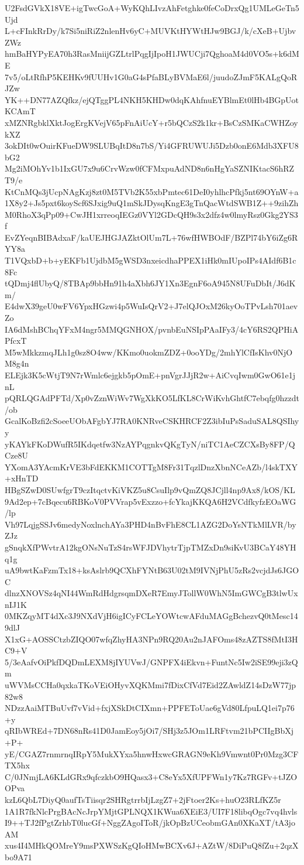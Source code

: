 U2FsdGVkX18VE+igTwcGoA+WyKQhLIvzAhFetghke0feCoDrxQg1UMLeGeTn5Ujd
L+cFInkRrDy/k7Si5niRiZ2nlenHv6yC+MUVKtHYWtHJw9BGJ/k/cXeB+UjbvZWz
hmBaHYPyEA70h3RasMniijGZLtrlPqgIjIpoH1JWUCji7QghoaM4d0VO5s+k6dME
7v5/oLtRfhP5KEHKv9fUUHv1G0aG4sPfaBLyBVMaE6l/juudoZJmF5KALgQoRJZw
YK++DN77AZQfkz/ejQTggPL4NKH5KHDw0dqKAhfnuEYBlmEt0lHb4BGpUotKCAmT
xMZNRgbklXktJogErgKVejV65pFnAiUcY+r5bQCzS2k1kr+BsCzSMKaCWHZoykXZ
3okDIt0wOuirKFueDW9SLUBqItD8n7bS/Yi4GFRUWUJi5Dzb0onE6Mdb3XFU8bG2
Mg2iMOhYv1b1IxGU7x9u6CrvWzw0fCFMxpuAdND8n6nHgYaSZNIKtacS6hRZT9/e
KtCnMQs3jUcpNAgKzj8zt0M5TVb2K55xbPmtec61DeI0yhlhcPfkj5nt69OYnW+a
1X8y2+Js5pxt6koyScf6SJxig9uQ1mSkJDysqKngE3gTnQacWtdSWB1Z++9zihZh
M0RhoX3qPp09+CwJH1xrreoqIEGz0VYl2GDcQH9s3x2dfz4w0lmyRsz0Gkg2YS3f
EvZYeqnBIBAdxaF/kaUEJHGJAZktOlUm7L+76wfHWBOdF/BZPl74bY6iZg6RYY8a
T1VQxbD+b+yEKFb1UjdbM5gWSD3nxeicdhaPPEX1iHk0mIUpoIPs4AIdf6B1c8Fc
tQDmj4flUbyQ/8TBAp9bbHn91h4aXbh6JY1Xn3EgnF6oA945N8UFuDbIt/J6dKm/
E4dwX39geU0wFV6YpxHGzwi4p5WuIsQrV2+J7elQJOxM26kyOoTPvLsh701aevZo
IA6dMshBChqYFxM4ngr5MMQGNHOX/pvnbEuNSIpPAaIFy3/4cY6RS2QPHiAPfcxT
M5wMkkzmqJLh1g0sz8O4ww/KKmo0uokmZDZ+0ooYDg/2mhYlCfIsKhv0NjOM8g4n
ELEjk3K5cWtjT9N7rWmlc6ejgkb5pOmE+pnVgrJJjR2w+AiCvqIwm0GwO61e1jnL
pQRLQGAdPFTd/Xp0vZznWiWv7WgXkKO5LfKL8CrWiKvhGhtfC7ebqfg0hzzdt/ob
GcalKoBzfi2cSoeeUObAFgbYJ7RA0KNRveCSKHRCF2Z3ibIuPsSaduSAL8QSIhyy
yKAYkFKoDWufR5IKdqetfw3NzAYPqgnkvQKgTyN/niTC1AeCZCXsBy8FP/QCze8U
YXomA3YAcmKrVE3bFdEKKM1COTTgM8Fr31TqzlDnzXbnNCeAZb/l4skTXY+xHnTD
HBgSZwD0SUwfgrT9czItqctvKiVKZ5u8CsuIlp9vQmZQ8JCjll4np9Ax8/kOS/KL
9Ad2ep+7cBqecu6RBKoV0PVVrap5vExzzo+fcYkajKKQA6H2VCdfkyfzEOaWG/lp
Vh97LqjgSSJv6medyNoxlnchAYa3PHD4nBvFhE8CL1AZG2DoYsNTkMlLVR/byZJz
gSnqkXfPWvtrA12kgONsNuTzS4rsWFJDVhytrTjpTMZxDn9siKvU3BCaY48YHq1g
uA9bwtKaFzmTx18+ksAslrb9QCXhFYNtB63U02tM9IVNjPhU5zRs2vcjdJs6JGOC
dlnzXNOVSz4qNI44WmRdHdgrsqmDXeR7EmyJTollW0WhN5ImGWCgB3tlwUxnIJ1K
0MKZqyMT4dXc3J9NXdVjH6igICyFCLeYOWtcwAFduMAGgBchezvQ0tMesc149dlJ
X1xG+AOSSCtzbZIQO07wfqZhyHA3NPn9RQ20Au2nJAFOms48zAZTS8fMtI3HC9+V
5/3eAafvOiPkfDQDmLEXM8jIYUVwJ/GNPFX4iEkvn+FuntNc5Iw2iSE99eji3zQm
uWVMsCCHa0qxkaTKoVEiOHyvXQKMmi7fDixCfVd7Eid2ZAwldZ14sDzW77jp82w8
NDzzAaiMTBuUvf7vVid+fxjXSkDtCIXmn+PPFEToUae6gVd80LfpuLQ1ei7p76+y
qRIbWREd+7DN68nRs41D0JamEoy5jOi7/SHj3z5JOm1LRFtvm21bPCIIgBbXj+P+
yE/CGAZ7rnmrnqIRpY5MukXYxa5hnwHxwcGRAGN9eKh9Vmwnt0Pr0Mzg3CFTX5hx
C/0JNmjLA6KLdGRx9qfczkbO9HQasx3+C8eYx5XfUPFWn1y7Kz7RGFv+tJZOOPva
kzL6QbL7DiyQ0aufTsTiisqr2SHRgtrrbIjLzgZ7+2jFtoer2Ks+huO23RLfKZ5r
1A1R7fkNlcPrgBAcNcJrpYMjtGPLNQX1KWua6XEiE3/UI7F18libqOgc7vq4hvls
I9++TJ2fPgtZrhbT0lucGf+NggZAgoIToR/jkOpBzUCeobmGAn0XKaXT/tA3joAM
xus4I4MHkQOMreY9msPXWSzKgQIoHMwBCXv6J+AZtW/8DiPuQ8fZu+2qzXbo9A71
